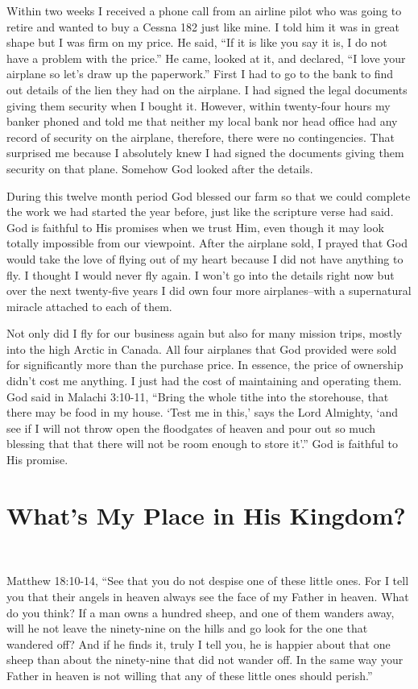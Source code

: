 \documentclass[oneside]{book}
\begin{document}
Within two weeks I received a phone call from an airline pilot who was going to retire and wanted to buy a Cessna 182 just like mine. I told him it was in great shape but I was firm on my price. He said, “If it is like you say it is, I do not have a problem with the price.” He came, looked at it, and declared, “I love your airplane so let's draw up the paperwork.” First I had to go to the bank to find out details of the lien they had on the airplane. I had signed the legal documents giving them security when I bought it. However, within twenty-four hours my banker phoned and told me that neither my local bank nor head office had any record of security on the airplane, therefore, there were no contingencies. That surprised me because I absolutely knew I had signed the documents giving them security on that plane. Somehow God looked after the details.

During this twelve month period God blessed our farm so that we could complete the work we had started the year before, just like the scripture verse had said. God is faithful to His promises when we trust Him, even though it may look totally impossible from our viewpoint. After the airplane sold, I prayed that God would take the love of flying out of my heart because I did not have anything to fly. I thought I would never fly again. I won't go into the details right now but over the next twenty-five years I did own four more airplanes--with a supernatural miracle attached to each of them. 

Not only did I fly for our business again but also for many mission trips, mostly into the high Arctic in Canada. All four airplanes that God provided were sold for significantly more than the purchase price. In essence, the price of ownership didn’t cost me anything. I just had the cost of maintaining and operating them. God said in Malachi 3:10-11, “Bring the whole tithe into the storehouse, that there may be food in my house. ‘Test me in this,’ says the Lord Almighty, ‘and see if I will not throw open the floodgates of heaven and pour out so much blessing that that there will not be room enough to store it’.” God is faithful to His promise.


\chapter{What's My Place in His Kingdom?}
\

Matthew 18:10-14, “See that you do not despise one of these little ones. For I tell you that their angels in heaven always see the face of my Father in heaven. What do you think? If a man owns a hundred sheep, and one of them wanders away, will he not leave the ninety-nine on the hills and go look for the one that wandered off? And if he finds it, truly I tell you, he is happier about that one sheep than about the ninety-nine that did not wander off. In the same way your Father in heaven is not willing that any of these little ones should perish.”
\end{document}
